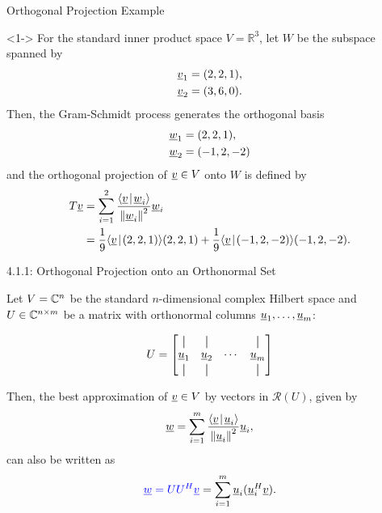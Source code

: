 \documentclass[10pt,english,aspectratio=169]{beamer}
\begin{document}
\begin{frame}{Orthogonal Projection Example}

\begin{example}<1->
For the standard inner product space $V = \mathbb{R}^3$, let $W$ be the subspace spanned by\vspace{-4mm}
\begin{align*}
\underline{v}_1 &= (2,2,1), \\
\underline{v}_2 &= (3,6,0).
\end{align*}
Then, the Gram-Schmidt process generates the orthogonal basis
 \vspace{-2mm}
\begin{align*}
\underline{w}_1 &= (2,2,1), \\
\underline{w}_2 &= (-1,2,-2)
\end{align*}
and the orthogonal projection of $\underline{v} \in V$ onto $W$ is defined by \vspace{-2mm}
\begin{align*}
T \underline{v} &= \sum_{i=1}^2 \frac{ {\left\langle  \underline{v}  \mskip2mu \middle| \mskip2mu  \underline{w}_i  \right\rangle} }{ \left\| \underline{w}_i \right\|^2 } \underline{w}_i \\ &= \frac{1}{9} {\left\langle  \underline{v}  \mskip2mu \middle| \mskip2mu  (2,2,1)  \right\rangle} (2,2,1) + \frac{1}{9} {\left\langle  \underline{v}  \mskip2mu \middle| \mskip2mu  (-1,2,-2)  \right\rangle} (-1,2,-2).
\end{align*}
\vspace*{-3.5mm}
\end{example}

\end{frame}


\newcommand*{\vertbar}{\rule[-1ex]{0.5pt}{2.5ex}}

\begin{frame}{4.1.1: Orthogonal Projection onto an Orthonormal Set}

Let $V = \mathbb{C}^n$ be the standard $n$-dimensional complex Hilbert space and $U \in \mathbb{C}^{n\times m}$ be a matrix with orthonormal columns $\underline{u}_1,\ldots,\underline{u}_m$:

\[ U = \begin{bmatrix} \vertbar & \vertbar & & \vertbar \\ \vecnot{u}_1 & \vecnot{u}_2 & \cdots & \vecnot{u}_m \\ \vertbar & \vertbar & & \vertbar \end{bmatrix} \]

\vspace{4mm}

Then, the best approximation of $\underline{v}\in V$ by vectors in $\mathcal{R}(U)$, given by
\begin{equation*}
\underline{w} = \sum_{i=1}^m \frac{ {\left\langle  \underline{v}  \mskip2mu \middle| \mskip2mu  \underline{u}_i  \right\rangle} }{ \left\| \underline{u}_i \right\|^2 } \underline{u}_i,
\end{equation*}
can also be written as
\[ {\color{blue}\underline{w} = U U^H \underline{v}} = \sum_{i=1}^m \underline{u}_i (\underline{u}_i^H \underline{v}). \]

\end{frame}
\end{document}
